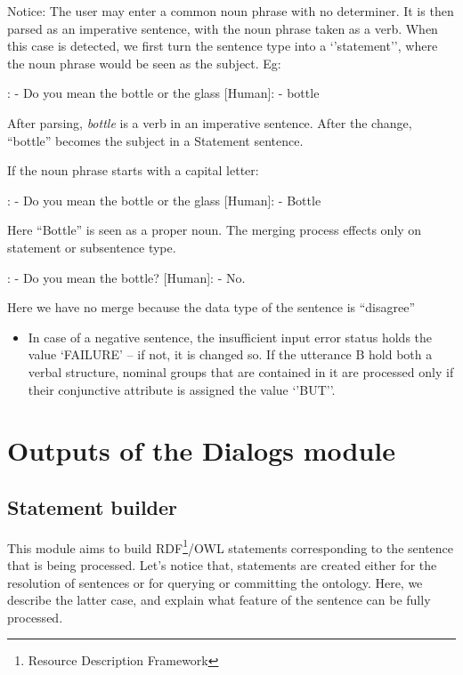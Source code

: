 \documentclass[twoside,a4paper,10pt]{report}
\begin{document}
Notice: The user may enter a common noun phrase with no determiner. It is then parsed as an imperative sentence, with the noun phrase taken as a verb. When this case is detected, we first turn the sentence type into a ‘’statement’’, where the noun phrase would be seen as the subject.
Eg:


\small
\begin{verbatimtab}
  [Robot]: - Do you mean the bottle or the glass
  [Human]: - bottle
\end{verbatimtab}
\normalsize

After parsing, \textsl{bottle} is a verb in an imperative sentence. After the change, “bottle” becomes the subject in a Statement sentence.

If the noun phrase starts with a capital letter:


\small
\begin{verbatimtab}
  [Robot]: - Do you mean the bottle or the glass
  [Human]: - Bottle
\end{verbatimtab}
\normalsize

Here “Bottle” is seen as a proper noun.
The merging process effects only on statement or subsentence type.



\small
\begin{verbatimtab}
  [Robot]: - Do you mean the bottle?
  [Human]: - No.
\end{verbatimtab}
\normalsize
Here we have no merge because the data type of the sentence is “disagree”


\begin{itemize}
    \item  In case of a negative sentence, the insufficient input error status holds the value ‘FAILURE’ – if not, it is changed so. If the utterance B hold both a verbal structure, nominal groups that are contained in it are processed only if their conjunctive attribute is assigned the value ‘’BUT’’.
\end{itemize}

\chapter{Outputs of the Dialogs module}
\label{576053c82466d3c58479c2551469261a}%

\section{Statement builder}
\label{96858fc1845b81e4956d78bc03e34978}%
This module aims to build RDF\footnote{Resource Description Framework}/OWL statements corresponding to the sentence that is being processed. 
Let's notice that, statements are created either for the resolution of sentences or for querying or committing the ontology.
Here, we describe the latter case, and explain what feature of the sentence can be fully processed.
\end{document}
